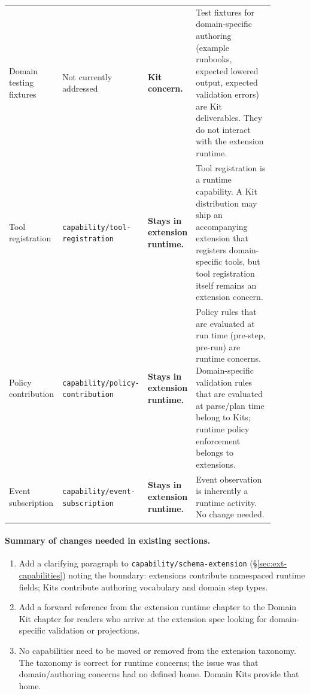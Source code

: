 \begin{longtable}{p{0.15\linewidth}p{0.13\linewidth}p{0.14\linewidth}p{0.46\linewidth}}
Domain testing fixtures &
  Not currently addressed &
  \textbf{Kit concern.} &
  Test fixtures for domain-specific authoring (example runbooks, expected lowered
  output, expected validation errors) are Kit deliverables.  They do not interact
  with the extension runtime. \\

Tool registration &
  \texttt{capability/\allowbreak tool-registration} &
  \textbf{Stays in extension runtime.} &
  Tool registration is a runtime capability.  A Kit distribution may ship an
  accompanying extension that registers domain-specific tools, but tool
  registration itself remains an extension concern. \\

Policy contribution &
  \texttt{capability/\allowbreak policy-contribution} &
  \textbf{Stays in extension runtime.} &
  Policy rules that are evaluated at run time (pre-step, pre-run) are runtime
  concerns.  Domain-specific validation rules that are evaluated at parse/plan
  time belong to Kits; runtime policy enforcement belongs to extensions. \\

Event subscription &
  \texttt{capability/\allowbreak event-subscription} &
  \textbf{Stays in extension runtime.} &
  Event observation is inherently a runtime activity.  No change needed. \\

\end{longtable}

\paragraph{Summary of changes needed in existing sections.}

\begin{enumerate}
  \item Add a clarifying paragraph to \texttt{capability/\allowbreak schema-extension}
    (\S\ref{sec:ext-capabilities}) noting the boundary: extensions contribute
    namespaced runtime fields; Kits contribute authoring vocabulary and domain
    step types.

  \item Add a forward reference from the extension runtime chapter to the
    Domain Kit chapter for readers who arrive at the extension spec looking for
    domain-specific validation or projections.

  \item No capabilities need to be moved or removed from the extension
    taxonomy.  The taxonomy is correct for runtime concerns; the issue was that
    domain/authoring concerns had no defined home.  Domain Kits provide that
    home.
\end{enumerate}

